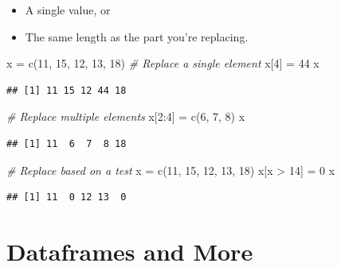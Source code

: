 \documentclass[
]{book}
\newenvironment{Shaded}{\begin{snugshade}}{\end{snugshade}}
\newcommand{\CommentTok}[1]{\textcolor[rgb]{0.56,0.35,0.01}{\textit{#1}}}
\newcommand{\DecValTok}[1]{\textcolor[rgb]{0.00,0.00,0.81}{#1}}
\newcommand{\FunctionTok}[1]{\textcolor[rgb]{0.00,0.00,0.00}{#1}}
\newcommand{\NormalTok}[1]{#1}
\newcommand{\OtherTok}[1]{\textcolor[rgb]{0.56,0.35,0.01}{#1}}
\newcommand{\SpecialCharTok}[1]{\textcolor[rgb]{0.00,0.00,0.00}{#1}}
\providecommand{\tightlist}{%
  \setlength{\itemsep}{0pt}\setlength{\parskip}{0pt}}
\begin{document}
\begin{itemize}
\tightlist
\item
  A single value, or
\item
  The same length as the part you're replacing.
\end{itemize}

\begin{Shaded}
\begin{Highlighting}[]
\NormalTok{x }\OtherTok{=} \FunctionTok{c}\NormalTok{(}\DecValTok{11}\NormalTok{, }\DecValTok{15}\NormalTok{, }\DecValTok{12}\NormalTok{, }\DecValTok{13}\NormalTok{, }\DecValTok{18}\NormalTok{)}
\CommentTok{\# Replace a single element}
\NormalTok{x[}\DecValTok{4}\NormalTok{] }\OtherTok{=} \DecValTok{44}
\NormalTok{x}
\end{Highlighting}
\end{Shaded}

\begin{verbatim}
## [1] 11 15 12 44 18
\end{verbatim}

\begin{Shaded}
\begin{Highlighting}[]
\CommentTok{\# Replace multiple elements}
\NormalTok{x[}\DecValTok{2}\SpecialCharTok{:}\DecValTok{4}\NormalTok{] }\OtherTok{=} \FunctionTok{c}\NormalTok{(}\DecValTok{6}\NormalTok{, }\DecValTok{7}\NormalTok{, }\DecValTok{8}\NormalTok{)}
\NormalTok{x}
\end{Highlighting}
\end{Shaded}

\begin{verbatim}
## [1] 11  6  7  8 18
\end{verbatim}

\begin{Shaded}
\begin{Highlighting}[]
\CommentTok{\# Replace based on a test}
\NormalTok{x }\OtherTok{=} \FunctionTok{c}\NormalTok{(}\DecValTok{11}\NormalTok{, }\DecValTok{15}\NormalTok{, }\DecValTok{12}\NormalTok{, }\DecValTok{13}\NormalTok{, }\DecValTok{18}\NormalTok{)}
\NormalTok{x[x }\SpecialCharTok{\textgreater{}} \DecValTok{14}\NormalTok{] }\OtherTok{=} \DecValTok{0}
\NormalTok{x}
\end{Highlighting}
\end{Shaded}

\begin{verbatim}
## [1] 11  0 12 13  0
\end{verbatim}

\hypertarget{dataframes-and-more}{%
\chapter{Dataframes and More}\label{dataframes-and-more}}
\end{document}
